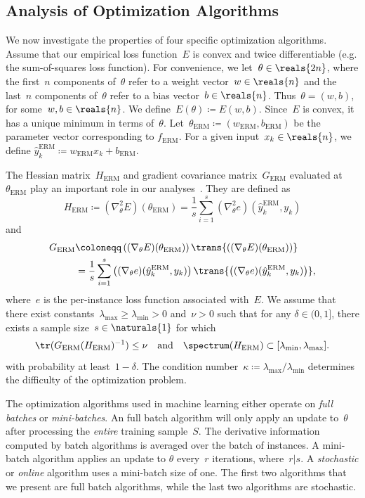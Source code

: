 \documentclass[11pt,a4paper]{article}
\numberwithin{equation}{section}
\begin{document}
\subsection{Analysis of Optimization Algorithms}

We now investigate the properties of four specific optimization algorithms.
Assume that our empirical loss function~$E$ is convex and twice differentiable
(e.g. the sum-of-squares loss function). For convenience, we let~$\theta \in
\reals{2n}$, where the first~$n$ components of~$\theta$ refer to a weight
vector~$w \in \reals{n}$ and the last~$n$ components of~$\theta$ refer to a bias
vector~$b \in \reals{n}$. Thus~$\theta = (w, b)$, for some~$w, b \in \reals{n}$.
We define~$E(\theta) \coloneqq E(w, b)$. Since~$E$ is convex, it has a unique
minimum in terms of~$\theta$. Let~$\theta_{\text{ERM}} \coloneqq
(w_{\text{ERM}}, b_{\text{ERM}})$ be the parameter vector corresponding to
$f_{\text{ERM}}$. For a given input~$x_k \in \reals{n}$, we define
$\hat{y}_k^{\text{ERM}} \coloneqq w_{\text{ERM}} x_k + b_{\text{ERM}}$.

The Hessian matrix~$H_{\text{ERM}}$ and gradient covariance
matrix~$G_{\text{ERM}}$ evaluated at~$\theta_{\text{ERM}}$ play an important
role in our analyses~\citep{bousquet2008tradeoffs}. They are defined as
\[
	H_{\text{ERM}} \coloneqq (\nabla_\theta^2 E)(\theta_{\text{ERM}})
	= \frac{1}{s} \sum_{i = 1}^s (\nabla_\theta^2 e)(\hat{y}_k^{\text{ERM}}, y_k)
\]
and
\begin{align*}
	G_{\text{ERM}}
	&\coloneqq \left((\nabla_\theta E)(\theta_{\text{ERM}})\right)
		\trans{\left((\nabla_\theta E)(\theta_{\text{ERM}})\right)} \\
	&= \frac{1}{s} \sum_{i = 1}^s
		\left((\nabla_\theta e)(\hat{y}_k^{\text{ERM}}, y_k)\right)
		\trans{\left((\nabla_\theta e)(\hat{y}_k^{\text{ERM}}, y_k)\right)},
\end{align*}
where~$e$ is the per-instance loss function associated with~$E$. We assume that
there exist constants~$\lambda_{\text{max}} \geq \lambda_{\text{min}} > 0$
and~$\nu > 0$ such that for any $\delta \in (0, 1]$, there exists a sample
size~$s \in \naturals{1}$ for which
\[
	\tr(G_{\text{ERM}} (H_{\text{ERM}})^{-1}) \leq \nu \quad\text{and}\quad
	\spectrum(H_{\text{ERM}}) \subset [\lambda_{\text{min}}, \lambda_{\text{max}}].
\]
with probability at least~$1 - \delta$. The condition number~$\kappa \coloneqq
\lambda_{\text{max}}/{\lambda_{\text{min}}}$ determines the difficulty of the
optimization problem.

The optimization algorithms used in machine learning either operate on
\emph{full batches} or \emph{mini-batches}. An full batch algorithm will only
apply an update to~$\theta$ after processing the \emph{entire} training
sample~$S$. The derivative information computed by batch algorithms is averaged
over the batch of instances. A mini-batch algorithm applies an update to
$\theta$ every~$r$ iterations, where~$r | s$. A \emph{stochastic} or
\emph{online} algorithm uses a mini-batch size of one. The first two algorithms
that we present are full batch algorithms, while the last two algorithms are
stochastic.
\end{document}
